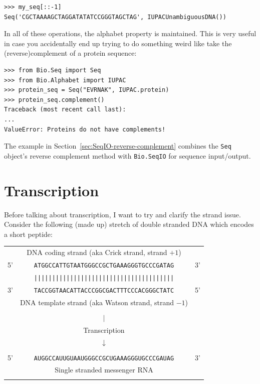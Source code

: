 \documentclass{report}
\begin{document}
\begin{verbatim}
>>> my_seq[::-1]
Seq('CGCTAAAAGCTAGGATATATCCGGGTAGCTAG', IUPACUnambiguousDNA())
\end{verbatim}

In all of these operations, the alphabet property is maintained. This is very
useful in case you accidentally end up trying to do something weird like take
the (reverse)complement of a protein sequence:

\begin{verbatim}
>>> from Bio.Seq import Seq
>>> from Bio.Alphabet import IUPAC
>>> protein_seq = Seq("EVRNAK", IUPAC.protein)
>>> protein_seq.complement()
Traceback (most recent call last):
...
ValueError: Proteins do not have complements!
\end{verbatim}

The example in Section~\ref{sec:SeqIO-reverse-complement} combines the \verb|Seq|
object's reverse complement method with \verb|Bio.SeqIO| for sequence input/output.

\section{Transcription}
Before talking about transcription, I want to try and clarify the strand issue.
Consider the following (made up) stretch of double stranded DNA which
encodes a short peptide:

\begin{tabular}{rcl}
\\
   & {\small DNA coding strand (aka Crick strand, strand $+1$)} & \\
5' & \texttt{ATGGCCATTGTAATGGGCCGCTGAAAGGGTGCCCGATAG} & 3' \\
   & \texttt{|||||||||||||||||||||||||||||||||||||||} & \\
3' & \texttt{TACCGGTAACATTACCCGGCGACTTTCCCACGGGCTATC} & 5' \\
   & {\small DNA template strand (aka Watson strand, strand $-1$)} & \\
\\
   & {\LARGE $|$} &\\
   & Transcription & \\
   & {\LARGE $\downarrow$} &\\
\\
5' & \texttt{AUGGCCAUUGUAAUGGGCCGCUGAAAGGGUGCCCGAUAG} & 3' \\
   & {\small Single stranded messenger RNA} & \\
\\
\end{tabular}
\end{document}
